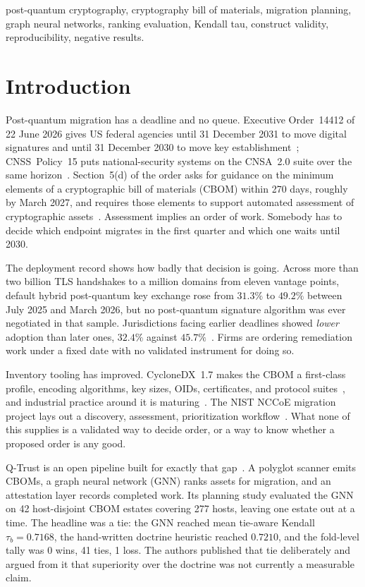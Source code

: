 \documentclass[journal,10pt]{IEEEtran}
\newcommand{\tb}{\tau_b}
\begin{document}
\begin{IEEEkeywords}
post-quantum cryptography, cryptography bill of materials, migration planning, graph neural
networks, ranking evaluation, Kendall tau, construct validity, reproducibility, negative results.
\end{IEEEkeywords}

\section{Introduction}

Post-quantum migration has a deadline and no queue. Executive Order~14412 of 22 June 2026 gives
US federal agencies until 31 December 2031 to move digital signatures and until 31 December 2030
to move key establishment~\cite{eo14412}; CNSS~Policy~15 puts national-security systems on the
CNSA~2.0 suite over the same horizon~\cite{cnssp15}. Section~5(d) of the order asks for guidance
on the minimum elements of a cryptographic bill of materials (CBOM) within 270 days, roughly by
March 2027, and requires those elements to support automated assessment of cryptographic
assets~\cite{eo14412}. Assessment implies an order of work. Somebody has to decide which endpoint
migrates in the first quarter and which one waits until 2030.

The deployment record shows how badly that decision is going. Across more than two billion TLS
handshakes to a million domains from eleven vantage points, default hybrid post-quantum key
exchange rose from $31.3\%$ to $49.2\%$ between July 2025 and March 2026, but no post-quantum
signature algorithm was ever negotiated in that sample. Jurisdictions facing earlier deadlines
showed \emph{lower} adoption than later ones, $32.4\%$ against $45.7\%$~\cite{mindthegap2026}.
Firms are ordering remediation work under a fixed date with no validated instrument for doing so.

Inventory tooling has improved. CycloneDX~1.7 makes the CBOM a first-class profile, encoding
algorithms, key sizes, OIDs, certificates, and protocol suites~\cite{cyclonedx}, and industrial
practice around it is maturing~\cite{ibm_cbom,hess2026,cryptoscope}. The NIST NCCoE migration
project lays out a discovery, assessment, prioritization workflow~\cite{nccoe_pqc}. What none of
this supplies is a validated way to decide order, or a way to know whether a proposed order is any
good.

Q-Trust is an open pipeline built for exactly that gap~\cite{qtrust_repo}. A polyglot scanner emits
CBOMs, a graph neural network (GNN) ranks assets for migration, and an attestation layer records
completed work. Its planning study evaluated the GNN on 42 host-disjoint CBOM estates covering 277
hosts, leaving one estate out at a time. The headline was a tie: the GNN reached mean tie-aware
Kendall $\tb=0.7168$, the hand-written doctrine heuristic reached $0.7210$, and the fold-level
tally was 0 wins, 41 ties, 1 loss. The authors published that tie deliberately and argued from it
that superiority over the doctrine was not currently a measurable claim.
\end{document}
